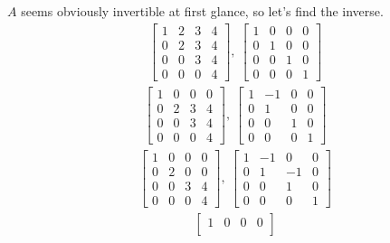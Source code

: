 \documentclass[12pt]{article}
\begin{document}
\begin{enumerate}
    $A$ seems obviously invertible at first glance, so let's find
    the inverse.
    \begin{align*}
      \begin{bmatrix}
        1 & 2 & 3 & 4\\
        0 & 2 & 3 & 4\\
        0 & 0 & 3 & 4\\
        0 & 0 & 0 & 4
      \end{bmatrix},\
      \begin{bmatrix}
        1 & 0 & 0 & 0\\
        0 & 1 & 0 & 0\\
        0 & 0 & 1 & 0\\
        0 & 0 & 0 & 1
      \end{bmatrix}
    \end{align*}
    \begin{align*}
      \begin{bmatrix}
        1 & 0 & 0 & 0\\
        0 & 2 & 3 & 4\\
        0 & 0 & 3 & 4\\
        0 & 0 & 0 & 4
      \end{bmatrix},\
      \begin{bmatrix}
        1 & -1 & 0 & 0\\
        0 & 1 & 0 & 0\\
        0 & 0 & 1 & 0\\
        0 & 0 & 0 & 1
      \end{bmatrix}
    \end{align*}
    \begin{align*}
      \begin{bmatrix}
        1 & 0 & 0 & 0\\
        0 & 2 & 0 & 0\\
        0 & 0 & 3 & 4\\
        0 & 0 & 0 & 4
      \end{bmatrix},\
      \begin{bmatrix}
        1 & -1 & 0 & 0\\
        0 & 1 & -1 & 0\\
        0 & 0 & 1 & 0\\
        0 & 0 & 0 & 1
      \end{bmatrix}
    \end{align*}
    \begin{align*}
      \begin{bmatrix}
        1 & 0 & 0 & 0\\

\end{bmatrix}
\end{align*}
\end{enumerate}
\end{document}
